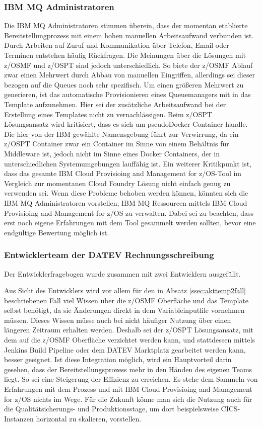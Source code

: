 \subsubsection{IBM MQ Administratoren}
Die IBM MQ Administratoren stimmen überein, dass der momentan etablierte Bereitstellungprozess mit einem hohen manuellen Arbeitsaufwand verbunden ist.
Durch Arbeiten auf Zuruf und Kommunikation über Telefon, Email oder Terminen entstehen häufig Rückfragen.
Die Meinungen über die Lösungen mit z/OSMF und z/OSPT sind jedoch unterschiedlich.
So biete der z/OSMF Ablauf zwar einen Mehrwert durch Abbau von manuellen Eingriffen, allerdings sei dieser bezogen auf die Queues noch sehr spezifisch.
Um einen größeren Mehrwert zu generieren, ist das automatische Provisionieren eines Queuemanagers mit in das Template aufzunehmen.
Hier sei der zusätzliche Arbeitsaufwand bei der Erstellung eines Templates nicht zu vernachlässigen.
Beim z/OSPT Lösungsansatz wird kritisiert, dass es sich  um \glqq pseudo\grqq Docker Container handle.
Die hier von der IBM gewählte Namensgebung führt zur Verwirrung, da ein z/OSPT Container zwar ein Container im Sinne von einem Behältnis für Middleware ist, jedoch nicht im Sinne eines Docker Containers, der in unterschiedlichen Systemumgebungen lauffähig ist.
Ein weiterer Kritikpunkt ist, dass das gesamte \glqq IBM Cloud Provisioing and Management for z/OS\grqq-Tool im Vergleich zur momentanen Cloud Foundry Lösung nicht einfach genug zu verwenden sei. 
Wenn diese Probleme behoben werden können, könnten sich die IBM MQ Administratoren vorstellen, IBM MQ Ressourcen mittels \glqq IBM Cloud Provisioing and Management for z/OS\grqq{} zu verwalten.
Dabei sei zu beachten, dass erst noch eigene Erfahrungen mit dem Tool gesammelt werden sollten, bevor eine endgültige Bewertung möglich ist.

\subsubsection{Entwicklerteam der DATEV Rechnungsschreibung}
Der Entwicklerfragebogen wurde zusammen mit zwei Entwicklern ausgefüllt.

Aus Sicht des Entwicklers wird vor allem für den in Absatz \ref{ssec:akttemp2fall} beschriebenen Fall viel Wissen über die z/OSMF Oberfläche und das Template selbst benötigt, da sie Änderungen direkt in dem Variableinputfile vornehmen müssen.
Dieses Wissen müsse auch bei nicht häufiger Nutzung über einen längeren Zeitraum erhalten werden.
Deshalb sei der z/OSPT Lösungsansatz, mit dem auf die z/OSMF Oberfläche verzichtet werden kann, und stattdessen mittels Jenkins Build Pipeline oder dem DATEV \glqq Marktplatz\grqq{} gearbeitet werden kann, besser geeignet.
Ist diese Integration möglich, wird ein Hauptvorteil darin gesehen, dass der Bereitstellungsprozess mehr in den Händen des eigenen Teams liegt.
So sei eine Steigerung der Effizienz zu erreichen.
Es stehe dem Sammeln von Erfahrungen mit dem Prozess und mit \glqq IBM Cloud Provisioing and Management for z/OS\grqq{} nichts im Wege.
Für die Zukunft könne man sich die Nutzung auch für die Qualitätsicherungs- und Produktionsstage, um dort beispielsweise CICS-Instanzen horizontal zu skalieren, vorstellen.

